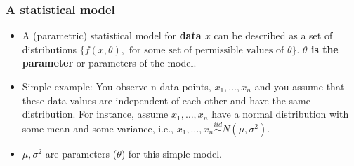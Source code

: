 \documentclass{beamer}
\begin{document}

\begin{frame}
  \frametitle{A statistical model}
  \begin{itemize}
\item A (parametric) statistical model for {\bf data $x$} can be described as a set of distributions $\{
    f(x,\theta),\mbox{ for some set of permissible values of }
    \theta\}$. {\bf $\theta$ is the parameter} or parameters of the model.
\item Simple example: You observe n data points, $x_1,\dots,x_n$ and you assume that these data values are independent of each other and have the same distribution. For instance, assume $x_1,\dots,x_n$ have a normal distribution with some mean and some variance, i.e., $x_1,\dots,x_n\stackrel{iid}{\sim} N(\mu,\sigma^2).$ 
\item $\mu,\sigma^2$ are parameters ($\theta$) for this simple model.
\end{itemize}
\end{frame}
\end{document}

